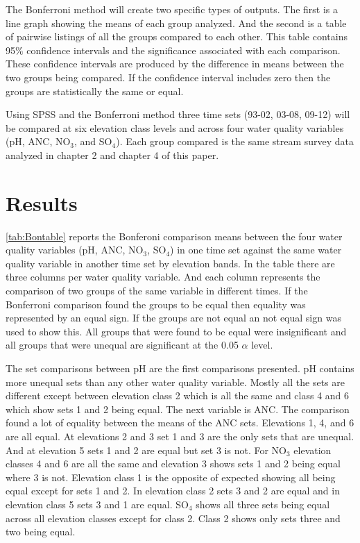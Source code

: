 The Bonferroni method will create two specific types of outputs.
The first is a line graph showing the means of each group analyzed.
And the second is  a table of pairwise listings of all the groups compared to each other.
This table contains 95$\%$ confidence intervals and the significance associated with each comparison.
These confidence intervals are produced by the difference in means between the two groups being compared.
If the confidence interval includes zero then the groups are statistically the same or equal.

Using SPSS and the Bonferroni method three time sets (93-02, 03-08, 09-12) will be compared at six elevation class levels and across four water quality variables (pH, ANC, NO$_3$, and SO$_4 $).
Each group compared is the same stream survey data analyzed in chapter 2 and chapter 4 of this paper.

\section{Results}

\autoref{tab:Bontable} reports the Bonferoni comparison means between the four water quality variables (pH, ANC, NO$_3$, SO$_4$) in one time set against the same water quality variable in another time set by elevation bands.
In the table there are three columns per water quality variable.
And each column represents the comparison of two groups of the same variable in different times.
If the Bonferroni comparison found the groups to be equal then equality was represented by an equal sign.
If the groups are not equal an not equal sign was used to show this.
All groups that were found to be equal were insignificant and all groups that were unequal are significant at the 0.05 $\alpha$ level.

The set comparisons between pH are the first comparisons presented.  
pH contains more unequal sets than any other water quality variable.
Mostly all the sets are different except between elevation class 2 which is all the same and class 4 and 6 which show sets 1 and 2 being equal.  
The next variable is ANC.  
The comparison found a lot of equality between the means of the ANC sets.  
Elevations 1, 4, and 6 are all equal.  
At elevations 2 and 3 set 1 and 3 are the only sets that are unequal. 
And at elevation 5 sets 1 and 2 are equal but set 3 is not.
For NO$_3$ elevation classes 4 and 6 are all the same and elevation 3 shows sets 1 and 2 being equal where 3 is not.  
Elevation class 1 is the opposite of expected showing all being equal except for sets 1 and 2.  
In elevation class 2 sets 3 and 2 are equal and in elevation class 5 sets 3 and 1 are equal.
SO$_4$ shows all three sets being equal across all elevation classes except for class 2.  
Class 2 shows only sets three and two being equal.

